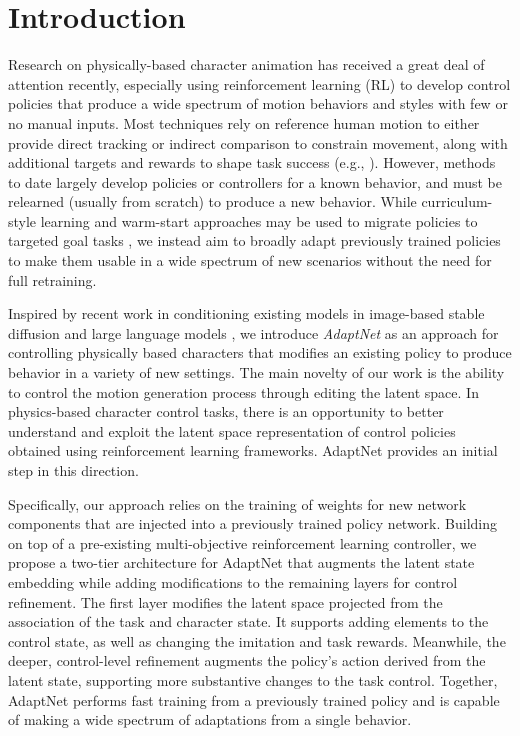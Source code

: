 \section{Introduction}
Research on physically-based character animation has received a great deal of attention recently, especially using reinforcement learning (RL) to develop control policies that produce a wide spectrum of motion behaviors and styles with few or no manual inputs. 
Most techniques
rely on reference human motion to either provide direct tracking or indirect comparison to constrain movement, along with additional
targets and rewards to shape task success (e.g., \cite{Peng2018,Liu2018,iccgan}).
However, 
methods to date largely develop policies or controllers for a known behavior, and must be relearned (usually from scratch) to produce a new behavior.  While curriculum-style learning and warm-start approaches may be used to migrate policies to targeted goal tasks \cite{Yin2021,Tao2022},
we instead aim to broadly adapt previously trained policies to make them usable in a wide spectrum of new scenarios without the need for full retraining.

Inspired by recent work  %
in conditioning existing models in image-based stable diffusion and large language models \cite{zhang2023adding,hu2021lora}, we introduce \emph{AdaptNet} as an approach for controlling physically based characters that modifies an existing policy to produce behavior in a variety of new settings. 
The main novelty of our work is the ability to control the motion generation process through editing the latent space. 
In physics-based character control tasks, there is an opportunity to better understand and exploit the latent space representation of control policies obtained using reinforcement learning frameworks. AdaptNet provides an initial step in this direction.

Specifically, our approach relies on the training of weights for new network components that are injected into a previously trained policy network.  Building on top of a pre-existing multi-objective reinforcement learning %
controller, we propose a two-tier architecture for AdaptNet that augments the latent state 
embedding while adding modifications to the remaining layers for control refinement. 
The first layer modifies the latent space projected from the association of the task and character state.  It supports adding elements to the control state, as well as changing the imitation and task rewards.  Meanwhile, the deeper, control-level refinement augments the policy's action derived from the latent state, supporting more substantive changes to the task control.
Together, AdaptNet performs fast training from a previously trained policy and is capable of making a wide spectrum of adaptations from a single behavior.


